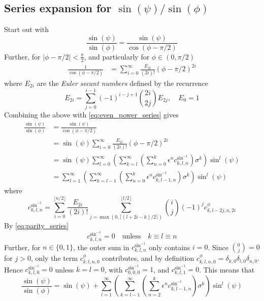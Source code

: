 \documentclass[a4paper]{amsart}
\begin{document}
\subsection{Series expansion for \texorpdfstring{$\sin(\psi)/\sin(\phi)$}{sin(ψ)/sin(φ)}}
Start out with
\begin{equation*}
\frac{\sin(\psi)}{\sin(\phi)}=\frac{\sin(\psi)}{\cos(\phi-\pi/2)}
\end{equation*}
Further, for $|\phi-\pi/2|<\tfrac{\pi}{2}$, and particularly for $\phi\in(0,\pi/2)$
\begin{align*}
\frac{1}{\cos(\phi-\pi/2)}&=\sum_{i=0}^\infty\frac{E_{2i}}{(2i)!}(\phi-\pi/2)^{2i}
\end{align*}
where $E_{2i}$ are the \emph{Euler secant numbers} defined by the recurrence
\begin{equation*}
E_{2i}=\sum_{j=0}^{i-1}(-1)^{i-j+1}\binom{2i}{2j}E_{2j},\quad E_0=1
\end{equation*}
Combining the above with \eqref{eq:even_power_series} gives
\begin{align}
\frac{\sin(\psi)}{\sin(\phi)}&=\frac{\sin(\psi)}{\cos(\phi-\pi/2)}\nonumber\\
&=\sin(\psi)\sum_{i=0}^\infty\frac{E_{2i}}{(2i)!}(\phi-\pi/2)^{2i}\nonumber\\
&=\sin(\psi)\sum_{l=0}^\infty\left(\sum_{k=l}^\infty\left(\sum_{n=0}^k\epsilon^nc^{\sin^{-1}}_{k,l,n}\right)\sigma^k\right)\sin^l(\psi)\nonumber\\
&=\sum_{l=1}^\infty\left(\sum_{k=l-1}^\infty\left(\sum_{n=0}^k\epsilon^nc^{\sin^{-1}}_{k,l-1,n}\right)\sigma^k\right)\sin^l(\psi)\label{eq:sin_psi_sin_phi}
\end{align}
where
\begin{equation*}
c^{\sin^{-1}}_{k,l,n}=\sum_{i=0}^{\lfloor n/2\rfloor}\frac{E_{2i}}{(2i)!}\sum_{j=\max(0,\lceil (l+2i-k)/2\rceil)}^{\lfloor l/2\rfloor}\binom{i}{j}(-1)^jc^{\phi}_{k,l-2j,n,2i}
\end{equation*}
By \eqref{eq:parity_series}
\begin{equation*}
c^{\sin^{-1}}_{k,l,n}=0\quad\text{unless}\quad k\equiv l\equiv n
\end{equation*}
Further, for $n\in\{0,1\}$, the outer sum in $c^{\sin^{-1}}_{k,l,n}$ only contains $i=0$. Since $\binom{0}{j}=0$ for $j>0$, only the term $c^\phi_{k,l,n,0}$ contributes, and by definition $c^\phi_{k,l,n,0}=\delta_{k,0}\delta_{l,0}\delta_{n,0}$. Hence $c^{\sin^{-1}}_{k,l,0}=0$ unless $k=l=0$, with $c^{\sin^{-1}}_{0,0,0}=1$, and $c^{\sin^{-1}}_{k,l,1}=0$. This means that
\begin{equation*}
\frac{\sin(\psi)}{\sin(\phi)}=\sin(\psi)+\sum_{l=1}^\infty\left(\sum_{k=l-1}^\infty\left(\sum_{n=2}^k\epsilon^nc^{\sin^{-1}}_{k,l-1,n}\right)\sigma^k\right)\sin^l(\psi)
\end{equation*}
\end{document}
